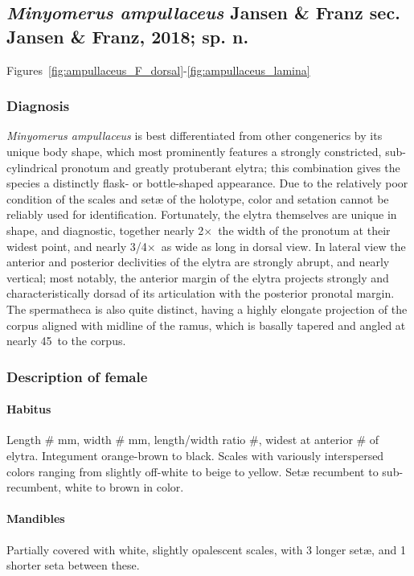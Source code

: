 \documentclass[fleqn,10pt,lineno]{wlpeerj} %
\newcommand{\td}{\textdegree~}
\newcommand{\x}{$\times$~}
\begin{document}
	\subsection*{\textit{Minyomerus ampullaceus} Jansen \& Franz sec. Jansen \& Franz, 2018; sp. n.}\label{ssec:amp}
		Figures~\ref{fig:ampullaceus_F_dorsal}-\ref{fig:ampullaceus_lamina}
		\subsubsection*{Diagnosis}
			\textit{Minyomerus ampullaceus} is best differentiated from other congenerics by its unique body shape, which most prominently features a strongly constricted, sub-cylindrical pronotum and greatly protuberant elytra; this combination gives the species a distinctly flask- or bottle-shaped appearance.
			Due to the relatively poor condition of the scales and set{\ae} of the holotype, color and setation cannot be reliably used for identification.
			Fortunately, the elytra themselves are unique in shape, and diagnostic, together nearly 2\x the width of the pronotum at their widest point, and nearly 3/4\x as wide as long in dorsal view.
			In lateral view the anterior and posterior declivities of the elytra are strongly abrupt, and nearly vertical; most notably, the anterior margin of the elytra projects strongly and characteristically dorsad of its articulation with the posterior pronotal margin.
			The spermatheca is also quite distinct, having a highly elongate projection of the corpus aligned with midline of the ramus, which is basally tapered and angled at nearly 45\td to the corpus.
		\subsubsection*{Description of female}
			\paragraph{Habitus}
				Length \# mm, width \# mm, length/width ratio \#, widest at anterior \# of elytra.
				Integument orange-brown to black. 
				Scales with variously interspersed colors ranging from slightly off-white to beige to yellow. 
				Set{\ae} recumbent to sub-recumbent, white to brown in color.
			\paragraph{Mandibles}
				Partially covered with white, slightly opalescent scales, with 3 longer set{\ae}, and 1 shorter seta between these.
\end{document}
